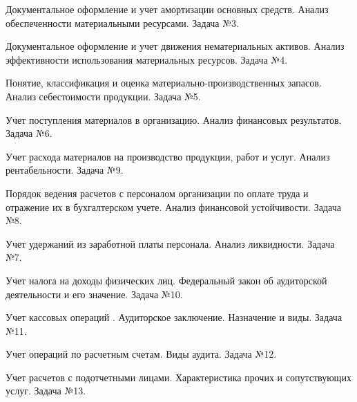\documentclass[
	11pt,
	a4paper,
	]
	{article}
\begin{document}
\bigskip

\noindent{} 
	{
		Документальное оформление и учет амортизации основных средств.
	}{
		Анализ обеспеченности материальными ресурсами.
	}{
		Задача №3.
	}

\bigskip

\noindent{} 
	{
		Документальное оформление и учет движения нематериальных активов.
	}{
		Анализ эффективности использования материальных ресурсов.
	}{
		Задача №4.
	}

\bigskip

\noindent{} 
	{
		Понятие, классификация и оценка материально-производственных запасов.
	}{
		Анализ себестоимости продукции.
	}{
		Задача №5.
	}

\bigskip

\noindent{} 
	{
		Учет поступления материалов в организацию.
	}{
		Анализ финансовых результатов.
	}{
		Задача №6.
	}

\bigskip

\noindent{} 
	{
		Учет расхода материалов на производство продукции, работ и услуг.
	}{
		Анализ рентабельности.
	}{
		Задача №9.
	}

\bigskip

\noindent{} 
	{
		Порядок ведения расчетов с персоналом организации по оплате труда и отражение их в бухгалтерском учете.
	}{
		Анализ финансовой устойчивости.
	}{
		Задача №8.
	}

\bigskip

\noindent{} 
	{
		Учет удержаний из заработной платы персонала.
	}{
		Анализ ликвидности.
	}{
		Задача №7.
	}

\bigskip

\noindent{} 
	{
		Учет налога на доходы физических лиц.
	}{
		Федеральный закон об аудиторской деятельности и его значение.
	}{
		Задача №10.
	}

\bigskip

\noindent{} 
	{
		Учет кассовых операций .
	}{
		Аудиторское заключение. Назначение и виды.
	}{
		Задача №11.
	}

\bigskip

\noindent{} 
	{
		Учет операций по расчетным счетам.
	}{
		Виды аудита.
	}{
		Задача №12.
	}

\bigskip

\noindent{} 
	{
		Учет расчетов с подотчетными лицами.
	}{
		Характеристика прочих и сопутствующих услуг.
	}{
		Задача №13.
	}

\bigskip
\end{document}
